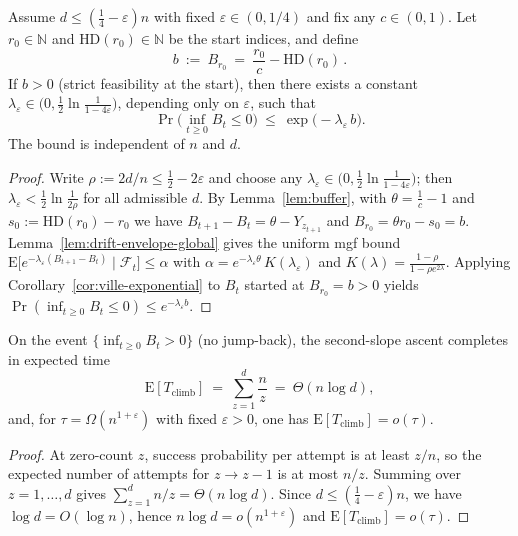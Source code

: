 \documentclass[lettersize,journal]{IEEEtran}
\newcommand{\EE}{\text{E}}
\newcommand{\HD}{\text{HD}}
\begin{document}
\begin{lemma}\label{lem:param-constant-c-general}
	Assume $d\le(\tfrac14-\varepsilon)n$ with fixed $\varepsilon\in(0,1/4)$ and fix any $c\in(0,1)$.
	Let $r_0\in\mathbb{N}$ and $\HD(r_0)\in\mathbb{N}$ be the start indices, and define
	\[
	b\ :=\ B_{r_0}\ =\ \frac{r_0}{c}-\HD(r_0)\,.
	\]
	If $b>0$ (strict feasibility at the start), then there exists a constant $\lambda_\varepsilon\in\big(0,\tfrac12\ln\frac{1}{1-4\varepsilon}\big)$, depending only on $\varepsilon$, such that
	\[
	\Pr\!\big(\inf_{t\ge 0} B_t \le 0\big)\ \le\ \exp\!\big(-\lambda_\varepsilon\, b\big).
	\]
	The bound is independent of $n$ and $d$.
\end{lemma}

\begin{proof}
	Write $\rho:=2d/n\le \tfrac12-2\varepsilon$ and choose any $\lambda_\varepsilon\in\big(0,\tfrac12\ln\frac{1}{1-4\varepsilon}\big)$; then $\lambda_\varepsilon<\tfrac12\ln\frac{1}{2\rho}$ for all admissible $d$.
	By Lemma~\ref{lem:buffer}, with $\theta=\tfrac{1}{c}-1$ and $s_0:=\HD(r_0)-r_0$ we have
	$B_{t+1}-B_t=\theta-Y_{z_{t+1}}$ and $B_{r_0}=\theta r_0-s_0=b$.
	Lemma~\ref{lem:drift-envelope-global} gives the uniform mgf bound
	$\EE\!\big[e^{-\lambda_\varepsilon(B_{t+1}-B_t)}\mid\mathcal F_t\big]\le \alpha$
	with $\alpha=e^{-\lambda_\varepsilon\theta}\,K(\lambda_\varepsilon)$ and
	$K(\lambda)=\frac{1-\rho}{1-\rho e^{2\lambda}}$.
	Applying Corollary~\ref{cor:ville-exponential} to $B_t$ started at $B_{r_0}=b>0$ yields
	$\Pr(\inf_{t\ge 0}B_t\le 0)\le e^{-\lambda_\varepsilon b}$.
\end{proof}

\begin{lemma}\label{prop:climb-time}
	On the event $\{\inf_{t\ge 0} B_t>0\}$ (no jump-back), the second-slope ascent completes in expected time
	\[
	\EE[T_{\mathrm{climb}}]\ =\ \sum_{z=1}^{d}\frac{n}{z}\ =\ \Theta(n\log d),
	\]
	and, for $\tau=\Omega(n^{1+\varepsilon})$ with fixed $\varepsilon>0$, one has $\EE[T_{\mathrm{climb}}]=o(\tau)$.
\end{lemma}

\begin{proof}
	At zero-count $z$, success probability per attempt is at least $z/n$, so the expected number of attempts for $z\!\to\! z-1$ is at most $n/z$.
	Summing over $z=1,\dots,d$ gives $\sum_{z=1}^{d}n/z=\Theta(n\log d)$.
	Since $d\le(\tfrac14-\varepsilon)n$, we have $\log d=O(\log n)$, hence $n\log d=o(n^{1+\varepsilon})$ and $\EE[T_{\mathrm{climb}}]=o(\tau)$.
\end{proof}
\end{document}
